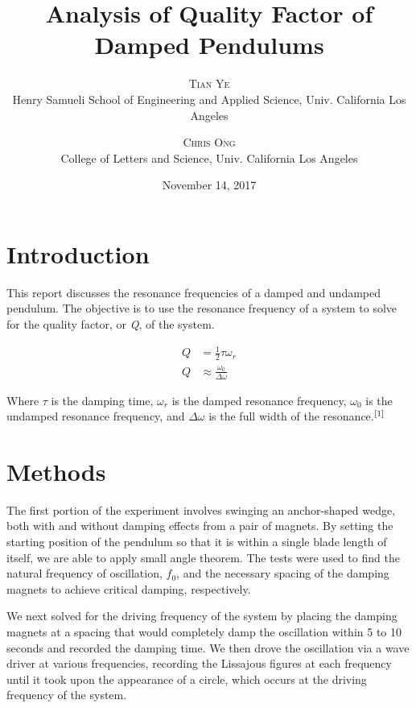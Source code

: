 \documentclass[twoside,twocolumn]{article}
\title{Analysis of Quality Factor of Damped Pendulums} %
\author{%
\textsc{Tian Ye} \\%
\normalsize Henry Samueli School of Engineering and Applied Science, Univ. California Los Angeles \\ %
\and %
\textsc{Chris Ong} \\%
\normalsize College of Letters and Science, Univ. California Los Angeles \\ %
}
\date{November 14, 2017} %
\begin{document}
\maketitle


\section{Introduction}

This report discusses the resonance frequencies of a damped and undamped pendulum. The objective is to use the resonance frequency of a system to solve for the quality factor, or \textit{Q}, of the system.

\footnotesize
\begin{align}
Q &= \frac{1}{2}\tau \omega_r \\
Q &\approx \frac{\omega_0}{\Delta \omega} 
\end{align}
\normalsize

\noindent Where $\tau$ is the damping time, $\omega_r$ is the damped resonance frequency, $\omega_0$ is the undamped resonance frequency, and $\Delta \omega$ is the full width of the resonance.$\textsuperscript{[1]}$ 

\section{Methods}

The first portion of the experiment involves swinging an anchor-shaped wedge, both with and without damping effects from a pair of magnets. By setting the starting position of the pendulum so that it is within a single blade length of itself, we are able to apply small angle theorem. The tests were used to find the natural frequency of oscillation, $f_0$, and the necessary spacing of the damping magnets to achieve critical damping, respectively.


\noindent We next solved for the driving frequency of the system by placing the damping magnets at a spacing that would completely damp the oscillation within 5 to 10 seconds and recorded the damping time. We then drove the oscillation via a wave driver at various frequencies, recording the Lissajous figures at each frequency until it took upon the appearance of a circle, which occurs at the driving frequency of the system.
\end{document}
